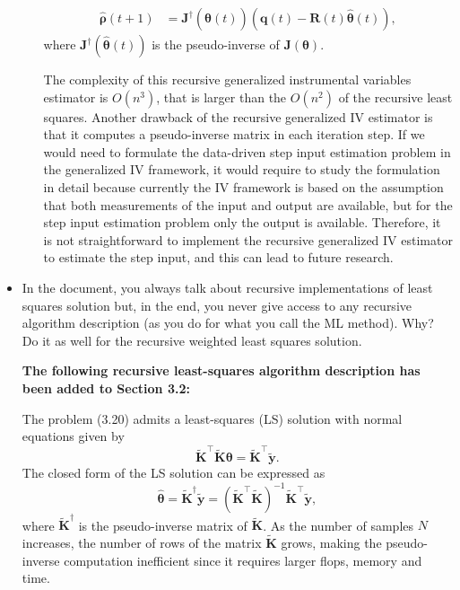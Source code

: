 \documentclass[11pt]{article}
\begin{document}
\begin{itemize}
\begin{itemize}
\begin{equation}
\begin{aligned}
        \widehat{\bm{\rho}} \left( t+1 \right)  &=  \mathbf{J}^\dagger \left( \widehat{\bm{\theta}} \left( t \right) \right) \left( \mathbf{q} \left( t \right) - \mathbf{R} \left( t \right) \widehat{\bm{\theta}} \left( t \right) \right) , \end{aligned} \end{equation}
        where $\mathbf{J}^\dagger \left( \widehat{\bm{\theta}} \left( t \right) \right)$ is the pseudo-inverse of $\mathbf{J} \left( \bm{\theta} \right)$.

        The complexity of this recursive generalized instrumental variables estimator is ${O}(n^3)$, that is larger than the ${O}(n^2)$ of the recursive least squares.
        Another drawback of the recursive generalized IV estimator is that it computes a pseudo-inverse matrix in each iteration step.
        If we would need to formulate the data-driven step input estimation problem in the generalized IV framework, it would require to study the formulation in detail because currently the IV framework is based on the assumption that both measurements of the input and output are available, but for the step input estimation problem only the output is available.
        Therefore, it is not straightforward to implement the recursive generalized IV estimator to estimate the step input, and this can lead to future research.
        \color{black}

    \end{itemize}
    \item In the document, you always talk about recursive implementations of least squares solution but, in the end, you never give access to any recursive algorithm description (as you do for what you call the ML method). Why? Do it as well for the recursive weighted least squares solution. 
    
    {\bfseries The following recursive least-squares algorithm description has been added to Section 3.2:}
    
    \color{blue} 
    The problem (3.20) admits a least-squares (LS) solution with normal equations given by
    \begin{equation} \tag{3.22} \widetilde{\mathbf{K}}^\top \widetilde{\mathbf{K}} \bm{\theta} = \widetilde{\mathbf{K}}^\top \widetilde{\mathbf{y}}.   \end{equation} %
    The closed form of the LS solution can be expressed as
    \begin{equation} \tag{3.23} \widehat{\bm{\theta}} = \widetilde{\mathbf{K}}^\dagger \widetilde{\mathbf{y}} = ( \widetilde{\mathbf{K}}^\top \widetilde{\mathbf{K}} )^{-1} \widetilde{\mathbf{K}}^\top \widetilde{\mathbf{y}} , \label{eqn:xhat} \end{equation}
    where $\widetilde{\mathbf{K}}^\dagger$ is the pseudo-inverse matrix of $\widetilde{\mathbf{K}}$.
    As the number of samples $N$ increases, the number of rows of the matrix $\widetilde{\mathbf{K}}$ grows, making the pseudo-inverse computation inefficient since it requires larger flops, memory and time.


\end{itemize}
\end{document}
